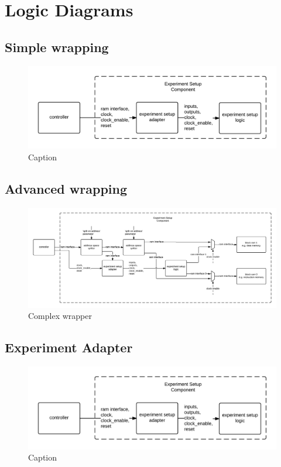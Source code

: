 \documentclass[openright]{template/uva-bachelor-thesis}
\begin{document}
\chapter{Logic Diagrams}

\section{Simple wrapping}
\begin{figure}[h]
    \centering
    \includegraphics[width=\textwidth]{img/logic-wrap-simple}
    \caption{Caption}
    \label{fig:logic-wrap-simple}
\end{figure}

\begin{landscape}
    \section{Advanced wrapping}
    \begin{figure}[h]
        \centering
        \includegraphics[width=\hsize]{img/logic-wrap-extended}
        \caption{Complex wrapper}
        \label{fig:logic-wrap-extended}
    \end{figure}
\end{landscape}

\section{Experiment Adapter}
\begin{figure}[h]
    \centering
    \includegraphics[width=\textwidth]{img/logic-wrap-simple}
    \caption{Caption}
    \label{fig:logic-experiment-adapter}
\end{figure}

\cleardoublepage


\printbibliography
\end{document}
